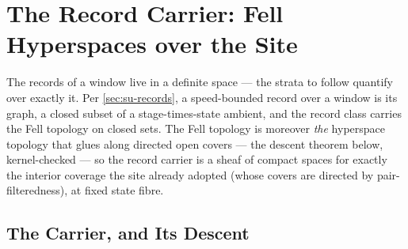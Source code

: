 \section{The Record Carrier: Fell Hyperspaces over the Site}
\label{sec:su-carrier}

The records of a window live in a definite space --- the strata to
follow quantify over exactly it. Per \autoref{sec:su-records}, a
speed-bounded record over a window is its graph, a closed subset of
a stage-times-state ambient, and the record class carries the Fell
topology on closed sets. The Fell topology is moreover \emph{the}
hyperspace topology that glues along directed open covers --- the
descent theorem below, kernel-checked --- so the record carrier is a
sheaf of compact spaces for exactly the interior coverage the site
already adopted (whose covers are directed by pair-filteredness), at
fixed state fibre.

\subsection{The Carrier, and Its Descent}

